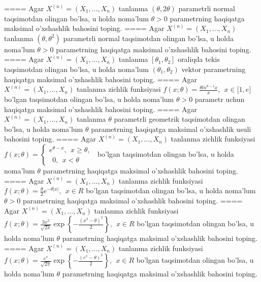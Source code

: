====
Agar \(X^{(n)} = \left( X_{1},...,X_{n} \right)\) tanlanma \((\theta,2\theta)\) parametrli normal taqsimotdan olingan bo'lsa, u holda noma'lum \(\theta > 0\) parametrning haqiqatga maksimal o'xshashlik bahosini toping.
====
Agar \(X^{(n)} = \left( X_{1},...,X_{n} \right)\) tanlanma \(\left( \theta,\theta^{2} \right)\) parametrli normal taqsimotdan olingan bo'lsa, u holda noma'lum \(\theta > 0\) parametrning haqiqatga maksimal o'xshashlik bahosini toping.
====
Agar \(X^{(n)} = \left( X_{1},...,X_{n} \right)\) tanlanma \(\left\lbrack \theta_{1},\theta_{2} \right\rbrack\) oraliqda tekis taqsimotdan olingan bo'lsa, u holda noma'lum \(\left( \theta_{1},\theta_{2} \right)\) vektor parametrning haqiqatga maksimal o'xshashlik bahosini toping.
====
Agar \(X^{(n)} = \left( X_{1},...,X_{n} \right)\) tanlanma zichlik funksiyasi \(f(x;\theta) = \frac{\theta ln^{\theta - 1}x}{x},\ \ x \in \lbrack 1,e\rbrack\) bo'lgan taqsimotdan olingan bo'lsa, u holda noma'lum \(\theta > 0\) parametr uchun haqiqatga maksimal o'xshashlik bahosini toping.
====
Agar \(X^{(n)} = \left( X_{1},...,X_{n} \right)\) tanlanma \(\theta\) parametrli geometrik taqsimotdan olingan bo'lsa, u holda noma'lum \(\theta\) parametrning haqiqatga maksimal o'xshashlik usuli bahosini toping.
====
Agar \(X^{(n)} = \left( X_{1},...,X_{n} \right)\) tanlanma zichlik funksiyasi\(f(x;\theta) = \left\{ \begin{matrix}
e^{\theta - x},\ \ x \geq \theta, \\
\ \ 0,\ \ x < \theta
\end{matrix} \right.\ \) bo'lgan taqsimotdan olingan bo'lsa, u holda noma'lum \(\theta\) parametrning haqiqatga maksimal o'xshashlik bahosini toping.
====
Agar \(X^{(n)} = \left( X_{1},...,X_{n} \right)\) tanlanma zichlik funksiyasi\(f(x;\theta) = \frac{\theta}{2}e^{- \theta|x|},\ \ x \in R\) bo'lgan taqsimotdan olingan bo'lsa, u holda noma'lum \(\theta > 0\) parametrning haqiqatga maksimal o'xshashlik bahosini toping.
====
Agar \(X^{(n)} = \left( X_{1},...,X_{n} \right)\) tanlanma zichlik funksiyasi \(f(x;\theta) = \frac{3x^{2}}{\sqrt{2\pi}}\exp\left\{ - \frac{\left( x^{3} - \theta \right)^{2}}{2} \right\},\ \ x \in R\) bo'lgan taqsimotdan olingan bo'lsa, u holda noma'lum \(\theta\) parametrning haqiqatga maksimal o'xshashlik bahosini toping.
====
Agar \(X^{(n)} = \left( X_{1},...,X_{n} \right)\) tanlanma zichlik funksiyasi \(f(x;\theta) = \frac{e^{x}}{\sqrt{2\pi}}\exp\left\{ - \frac{\left( e^{x} - \theta \right)^{2}}{2} \right\},\ \ x \in R\) bo'lgan taqsimotdan olingan bo'lsa, u holda noma'lum \(\theta\) parametrning haqiqatga maksimal o'xshashlik bahosini toping.
